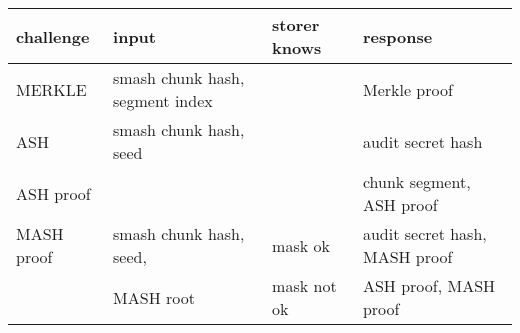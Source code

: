 \documentclass{standalone}
\begin{document}
\begin{tabular}{|l|l|l|l|}
\hline
 \textbf{challenge} & \textbf{input} & \textbf{storer knows} & \textbf{response} \\ \hline \hline
 MERKLE & smash chunk hash, segment index & & Merkle proof  \\ \cline{1-1} \cline {4-4}
 ASH & smash chunk hash, seed & & audit secret hash \\ \cline{1-1} \cline {4-4}
 ASH proof & & & chunk segment, ASH proof \\ \hline
 MASH proof & smash chunk hash, seed, & mask ok & audit secret hash, MASH proof \\ \cline{3-4}
  & MASH root & mask not ok & ASH proof, MASH proof \\
  \hline
\end{tabular}
\end{document}
